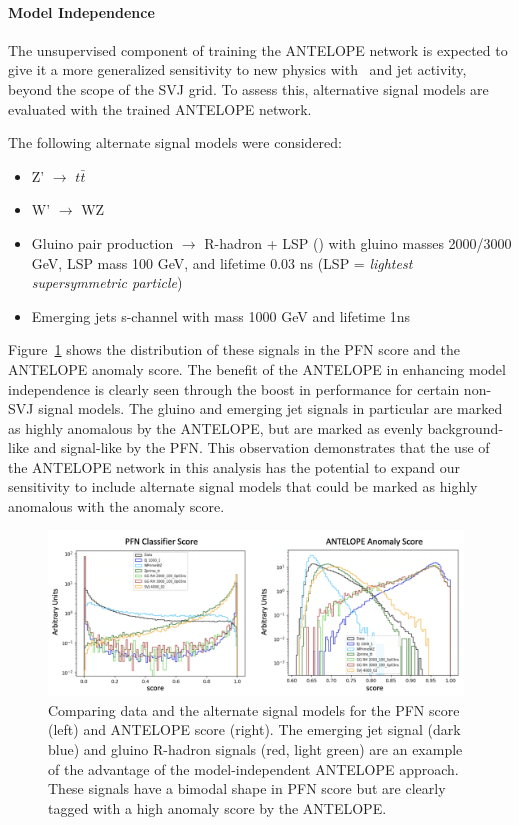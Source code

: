 \paragraph{Model Independence} 

The unsupervised component of training the ANTELOPE network is expected to give it a more generalized sensitivity to new physics with \met~and jet activity, beyond the scope of the SVJ grid. 
To assess this, alternative signal models are evaluated with the trained ANTELOPE network.

The following alternate signal models were considered: 
\begin{itemize}
\item Z' $\rightarrow$ $t\bar{t}$ 
\item W' $\rightarrow$ WZ 
\item Gluino pair production $\rightarrow$ R-hadron + LSP (\met) with gluino masses 2000/3000 GeV, LSP mass 100 GeV, and lifetime 0.03 ns (LSP = \textit{lightest supersymmetric particle})
\item Emerging jets s-channel with mass 1000 GeV and lifetime 1ns 
\end{itemize}

Figure~\ref{fig:antelope_altsig} shows the distribution of these signals in the PFN score and the ANTELOPE anomaly score.
The benefit of the ANTELOPE in enhancing model independence is clearly seen through the boost in performance for certain non-SVJ signal models.
The gluino and emerging jet signals in particular are marked as highly anomalous by the ANTELOPE, but are marked as evenly background-like and signal-like by the PFN.
This observation demonstrates that the use of the ANTELOPE network in this analysis has the potential to expand our sensitivity to include alternate signal models that could be marked as highly anomalous with the anomaly score.

\begin{figure}[!htbp]
\centering
   \includegraphics[width=0.98\textwidth]{figures/ml/antelope_vs_pfn_score}
    \caption{Comparing data and the alternate signal models for the PFN score (left) and ANTELOPE score (right). The emerging jet signal (dark blue) and gluino R-hadron signals (red, light green) are an example of the advantage of the model-independent ANTELOPE approach. These signals have a bimodal shape in PFN score but are clearly tagged with a high anomaly score by the ANTELOPE.
    \label{fig:antelope_altsig}}
\end{figure}





